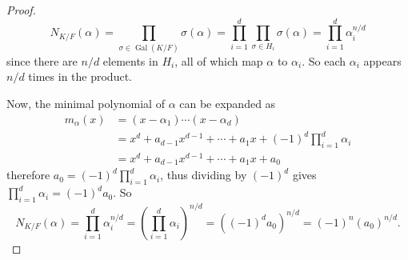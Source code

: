 \documentclass[10pt]{article}
\DeclareMathOperator*{\Gal}{Gal}
\begin{document}
\begin{enumerate}
\begin{proof}
$$
N_{K/F}(\alpha) = \prod_{\sigma \in \Gal (K/F)} \sigma(\alpha) = \prod_{i=1}^d \prod_{\sigma \in H_i} \sigma(\alpha) = \prod_{i=1}^d \alpha_i^{n/d}
$$
since there are $n/d$ elements in $H_i$, all of which map $\alpha$ to $\alpha_i$.  So each $\alpha_i$ appears $n/d$ times in the product.

Now, the minimal polynomial of $\alpha$ can be expanded as 
\begin{align*}
m_{\alpha}(x) &= (x - \alpha_1)\cdots(x-\alpha_d)
\\
&= x^d + a_{d-1}x^{d-1} + \cdots + a_1x + (-1)^d\prod_{i=1}^d \alpha_i
\\
&= x^d + a_{d-1}x^{d-1} + \cdots + a_1x + a_0
\end{align*}
therefore $a_0 = (-1)^d\prod_{i=1}^d \alpha_i$, thus dividing by $(-1)^d$ gives $\prod_{i=1}^d \alpha_i = (-1)^d a_0$.  So $$N_{K/F}(\alpha) = \prod_{i=1}^d \alpha_i^{n/d} = \left( \prod_{i=1}^d \alpha_i \right)^{n/d} = ((-1)^d a_0)^{n/d} = (-1)^n (a_0)^{n/d}.$$

\end{proof}

\end{enumerate}
\end{document}

